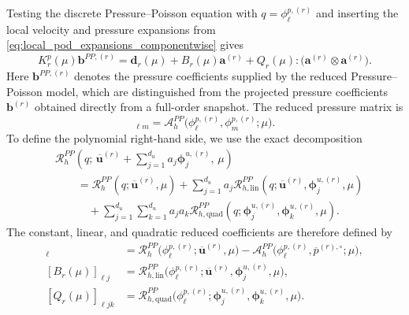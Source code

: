 Testing the discrete Pressure--Poisson equation with
$q=\phi^{p,(r)}_\ell$ and inserting the local velocity and pressure
expansions from \eqref{eq:local_pod_expansions_componentwise} gives
\begin{equation}
  K_r^p(\mu)\boldsymbol{b}^{PP,(r)}
  =
  \boldsymbol{d}_r(\mu)
  +B_r(\mu)\boldsymbol{a}^{(r)}
  +Q_r(\mu):
   \bigl(
     \boldsymbol{a}^{(r)}
     \otimes
     \boldsymbol{a}^{(r)}
   \bigr).
  \label{eq:reduced_pressure_poisson_system}
\end{equation}
Here $\boldsymbol{b}^{PP,(r)}$ denotes the pressure coefficients supplied by
the reduced Pressure--Poisson model, which are distinguished from the
projected pressure coefficients $\boldsymbol{b}^{(r)}$ obtained directly
from a full-order snapshot.  The reduced pressure matrix is
\begin{equation}
  [K_r^p(\mu)]_{\ell m}
  =
  \mathscr{A}^{PP}_h
  \bigl(
    \phi^{p,(r)}_\ell,
    \phi^{p,(r)}_m;\mu
  \bigr).
  \label{eq:pressure_poisson_stiffness}
\end{equation}
To define the polynomial right-hand side, we use the exact decomposition
\begin{align}
  &\mathscr{R}^{PP}_h
  \left(
    q;\,
    \overline{\boldsymbol{u}}^{(r)}
    +\sum_{j=1}^{d_u}
     a_j\boldsymbol{\phi}^{u,(r)}_j,\,
    \mu
  \right)
  \nonumber\\
  &\qquad
  =
  \mathscr{R}^{PP}_h
  \left(
    q;\overline{\boldsymbol{u}}^{(r)},\mu
  \right)
  +\sum_{j=1}^{d_u}
   a_j
   \mathscr{R}^{PP}_{h,\mathrm{lin}}
   \left(
     q;\overline{\boldsymbol{u}}^{(r)},
     \boldsymbol{\phi}^{u,(r)}_j,\mu
   \right)
  \nonumber\\
  &\qquad\quad
  +\sum_{j=1}^{d_u}
   \sum_{k=1}^{d_u}
   a_j a_k
   \mathscr{R}^{PP}_{h,\mathrm{quad}}
   \left(
     q;
     \boldsymbol{\phi}^{u,(r)}_j,
     \boldsymbol{\phi}^{u,(r)}_k,\mu
   \right).
  \label{eq:pressure_poisson_rhs_decomposition}
\end{align}
The constant, linear, and quadratic reduced coefficients are therefore
defined by
\begin{align}
  [\boldsymbol{d}_r(\mu)]_\ell
  &=
  \mathscr{R}^{PP}_h
  \bigl(
    \phi^{p,(r)}_\ell;
    \overline{\boldsymbol{u}}^{(r)},\mu
  \bigr)
  -
  \mathscr{A}^{PP}_h
  \bigl(
    \phi^{p,(r)}_\ell,
    \overline{p}^{(r),\circ};\mu
  \bigr),
  \label{eq:pressure_poisson_constant}\\
  [B_r(\mu)]_{\ell j}
  &=
  \mathscr{R}^{PP}_{h,\mathrm{lin}}
  \bigl(
    \phi^{p,(r)}_\ell;
    \overline{\boldsymbol{u}}^{(r)},
    \boldsymbol{\phi}^{u,(r)}_j,\mu
  \bigr),
  \label{eq:pressure_poisson_linear}\\
  [Q_r(\mu)]_{\ell jk}
  &=
  \mathscr{R}^{PP}_{h,\mathrm{quad}}
  \bigl(
    \phi^{p,(r)}_\ell;
    \boldsymbol{\phi}^{u,(r)}_j,
    \boldsymbol{\phi}^{u,(r)}_k,\mu
  \bigr).
  \label{eq:pressure_poisson_quadratic}
\end{align}
